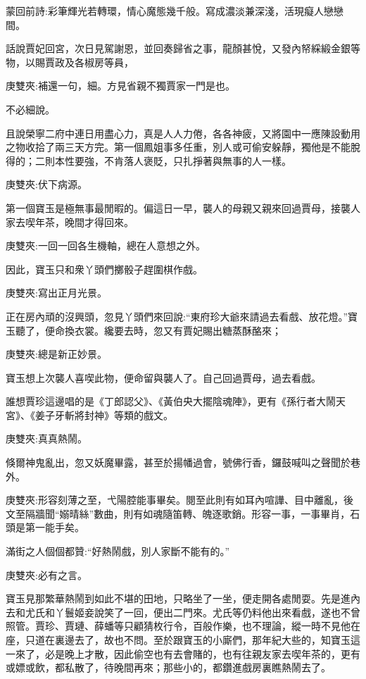 

\begin{parag}
    \begin{note}蒙回前詩:彩筆輝光若轉環，情心魔態幾千般。寫成濃淡兼深淺，活現癡人戀戀間。\end{note}
\end{parag}


\begin{parag}
    話說賈妃回宮，次日見駕謝恩，並回奏歸省之事，龍顏甚悅，又發內帑綵緞金銀等物，以賜賈政及各椒房等員，\begin{note}庚雙夾:補還一句，細。方見省親不獨賈家一門是也。\end{note}不必細說。
\end{parag}


\begin{parag}
    且說榮寧二府中連日用盡心力，真是人人力倦，各各神疲，又將園中一應陳設動用之物收拾了兩三天方完。第一個鳳姐事多任重，別人或可偷安躲靜，獨他是不能脫得的；二則本性要強，不肯落人褒貶，只扎掙著與無事的人一樣。\begin{note}庚雙夾:伏下病源。\end{note}第一個寶玉是極無事最閒暇的。偏這日一早，襲人的母親又親來回過賈母，接襲人家去喫年茶，晚間才得回來。\begin{note}庚雙夾:一回一回各生機軸，總在人意想之外。\end{note}因此，寶玉只和衆丫頭們擲骰子趕圍棋作戲。\begin{note}庚雙夾:寫出正月光景。\end{note}正在房內頑的沒興頭，忽見丫頭們來回說:“東府珍大爺來請過去看戲、放花燈。”寶玉聽了，便命換衣裳。纔要去時，忽又有賈妃賜出糖蒸酥酪來；\begin{note}庚雙夾:總是新正妙景。\end{note}寶玉想上次襲人喜喫此物，便命留與襲人了。自己回過賈母，過去看戲。
\end{parag}


\begin{parag}
    誰想賈珍這邊唱的是《丁郎認父》、《黃伯央大擺陰魂陣》，更有《孫行者大鬧天宮》、《姜子牙斬將封神》等類的戲文。\begin{note}庚雙夾:真真熱鬧。\end{note}倏爾神鬼亂出，忽又妖魔畢露，甚至於揚幡過會，號佛行香，鑼鼓喊叫之聲聞於巷外。\begin{note}庚雙夾:形容刻薄之至，弋陽腔能事畢矣。閱至此則有如耳內喧譁、目中離亂，後文至隔牆聞“嫋晴絲”數曲，則有如魂隨笛轉、魄逐歌銷。形容一事，一事畢肖，石頭是第一能手矣。\end{note}滿街之人個個都贊:“好熱鬧戲，別人家斷不能有的。”\begin{note}庚雙夾:必有之言。\end{note}寶玉見那繁華熱鬧到如此不堪的田地，只略坐了一坐，便走開各處閒耍。先是進內去和尤氏和丫鬟姬妾說笑了一回，便出二門來。尤氏等仍料他出來看戲，遂也不曾照管。賈珍、賈璉、薛蟠等只顧猜枚行令，百般作樂，也不理論，縱一時不見他在座，只道在裏邊去了，故也不問。至於跟寶玉的小廝們，那年紀大些的，知寶玉這一來了，必是晚上才散，因此偷空也有去會賭的，也有往親友家去喫年茶的，更有或嫖或飲，都私散了，待晚間再來；那些小的，都鑽進戲房裏瞧熱鬧去了。
\end{parag}


